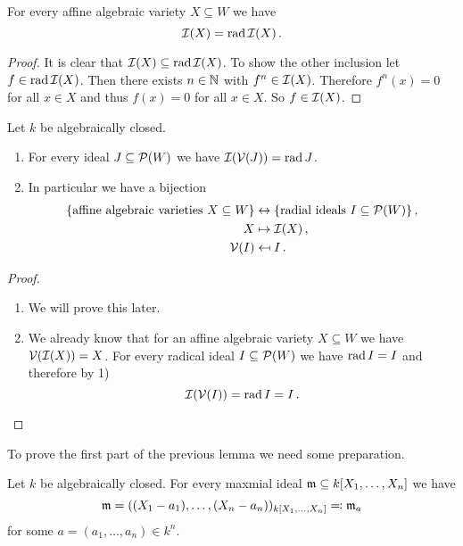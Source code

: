 \begin{lem}
  For every affine algebraic variety $X \subseteq W$ we have
  \[
    \mathcal{I}(X)
  = \operatorname{rad} \mathcal{I}(X) \,.
  \]
\end{lem}
\begin{proof}
  It is clear that $\mathcal{I}(X) \subseteq \operatorname{rad} \mathcal{I}(X)$.
  To show the other inclusion let \mbox{$f \in \operatorname{rad} \mathcal{I}(X)$}.
  Then there exists $n \in \mathbb{N}$ with $f^n \in \mathcal{I}(X)$.
  Therefore $f^n(x) = 0$ for all $x \in X$ and thus $f(x) = 0$ for all $x \in X$.
  So $f \in \mathcal{I}(X)$.
\end{proof}


\begin{prop}
  Let $k$ be algebraically closed.
  \begin{enumerate}[label=\emph{\alph*)},leftmargin=*]
    \item
      For every ideal $J \subseteq \mathcal{P}(W)$ we have $\mathcal{I}(\mathcal{V}(J)) = \operatorname{rad} J$.
    \item
      In particular we have a bijection
      \begin{align*}
                          \{\text{affine algebraic varieties $X \subseteq W$}\}
        &\leftrightarrow  \{\text{radial ideals $I \subseteq \mathcal{P}(W)$}\} \,,  \\
                          X
        &\mapsto          \mathcal{I}(X) \,, \\
                          \mathcal{V}(I)
        &\mapsfrom        I \,.
    \end{align*}
  \end{enumerate}
\end{prop}
\begin{proof}
  \begin{enumerate}[label=\emph{\alph*)},leftmargin=*]
    \item
      We will prove this later.
    \item
      We already know that for an affine algebraic variety $X \subseteq W$ we have $\mathcal{V}(\mathcal{I}(X)) = X$.
      For every radical ideal $I \subseteq \mathcal{P}(W)$ we have $\operatorname{rad} I = I$ and therefore by 1)
      \[
          \mathcal{I}(\mathcal{V}(I))
        = \operatorname{rad} I
        = I \,.
        \qedhere
      \]
  \end{enumerate}
\end{proof}


To prove the first part of the previous lemma we need some preparation.


\begin{thrm}
  Let $k$ be algebraically closed.
  For every maxmial ideal \mbox{$\mathfrak{m} \subseteq k[X_1, \dotsc, X_n]$} we have
  \[
              \mathfrak{m}
    =         ( (X_1 - a_1), \dotsc, (X_n - a_n) )_{k[X_1, \dotsc, X_n]}
    \eqqcolon \mathfrak{m}_a
  \]
  for some $a = (a_1, \dotsc, a_n) \in k^n$.
\end{thrm}


